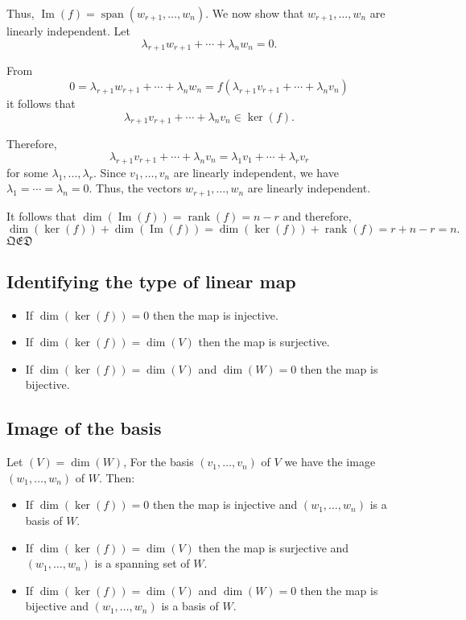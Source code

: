     Thus, \(\operatorname{Im}(f) = \operatorname{span}(w_{r+1}, \ldots, w_n)\). We now show that \(w_{r+1}, \ldots, w_n\) are linearly independent. Let 
    \[\lambda_{r+1}w_{r+1} + \cdots + \lambda_n w_n = 0.\]
    
    From
    \[0 = \lambda_{r+1}w_{r+1} + \cdots + \lambda_n w_n = f(\lambda_{r+1}v_{r+1} + \cdots + \lambda_n v_n)\]
    it follows that
    \[\lambda_{r+1}v_{r+1} + \cdots + \lambda_n v_n \in \ker(f).\]
    
    Therefore,
    \[\lambda_{r+1}v_{r+1} + \cdots + \lambda_n v_n = \lambda_1v_1 + \cdots + \lambda_r v_r\]
    for some \(\lambda_1, \ldots, \lambda_r\). Since \(v_1, \ldots, v_n\) are linearly independent, we have \(\lambda_1 = \cdots = \lambda_n = 0\). Thus, the vectors \(w_{r+1}, \ldots, w_n\) are linearly independent.
    
    It follows that \(\dim(\operatorname{Im}(f)) = \operatorname{rank}(f) = n - r\) and therefore,
    \[\dim(\ker(f)) + \dim(\operatorname{Im}(f)) = \dim(\ker(f)) + \operatorname{rank}(f) = r + n - r = n.\]
  \(\mathfrak{QED}\)
  
\subsection{Identifying the type of linear map}

\begin{itemize}[label=\(-\)]
    
\item If \(\dim(\ker(f)) = 0\) then the map is injective.

\item If \(\dim(\ker(f)) = \dim(V)\) then the map is surjective.

\item If \(\dim(\ker(f)) = \dim(V)\) and \(\dim(W) = 0\) then the map is bijective.
\end{itemize}

\subsection{Image of the basis}

Let \((V) = \dim(W)\), For the basis \((v_1, \dots, v_n)\) of \(V\) we have the image \((w_1, \dots, w_n)\) of \(W\). Then:
\begin{itemize}[label=\(-\)]
    \item If \(\dim(\ker(f)) = 0\) then the map is injective and \((w_1, \dots, w_n)\) is a basis of \(W\).
    
    \item If \(\dim(\ker(f)) = \dim(V)\) then the map is surjective and \((w_1, \dots, w_n)\) is a spanning set of \(W\).
    
    \item If \(\dim(\ker(f)) = \dim(V)\) and \(\dim(W) = 0\) then the map is bijective and \((w_1, \dots, w_n)\) is a basis of \(W\).
\end{itemize}
